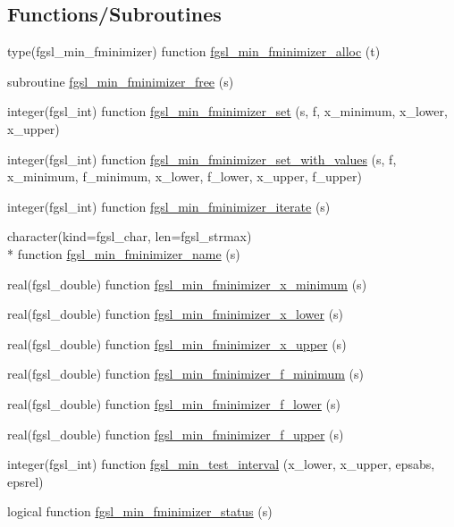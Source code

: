 \subsection*{Functions/\-Subroutines}
\begin{DoxyCompactItemize}
\item 
type(fgsl\-\_\-min\-\_\-fminimizer) function \hyperlink{min_8finc_a97de5ab1b2ebed28f37cb39e68d37f8e}{fgsl\-\_\-min\-\_\-fminimizer\-\_\-alloc} (t)
\item 
subroutine \hyperlink{min_8finc_a16f5fcf8f532d2dfd847713e2eb365fd}{fgsl\-\_\-min\-\_\-fminimizer\-\_\-free} (s)
\item 
integer(fgsl\-\_\-int) function \hyperlink{min_8finc_aebda9dded327ca8921ee1cb2e670d505}{fgsl\-\_\-min\-\_\-fminimizer\-\_\-set} (s, f, x\-\_\-minimum, x\-\_\-lower, x\-\_\-upper)
\item 
integer(fgsl\-\_\-int) function \hyperlink{min_8finc_aad6cfe468d6d91f3b2116b2a6061d2fc}{fgsl\-\_\-min\-\_\-fminimizer\-\_\-set\-\_\-with\-\_\-values} (s, f, x\-\_\-minimum, f\-\_\-minimum, x\-\_\-lower, f\-\_\-lower, x\-\_\-upper, f\-\_\-upper)
\item 
integer(fgsl\-\_\-int) function \hyperlink{min_8finc_a5160e2c8eadc15b80784a0aca5554f3c}{fgsl\-\_\-min\-\_\-fminimizer\-\_\-iterate} (s)
\item 
character(kind=fgsl\-\_\-char, len=fgsl\-\_\-strmax) \\*
function \hyperlink{min_8finc_a3396297e9c77f8b4cd38c67566eac9be}{fgsl\-\_\-min\-\_\-fminimizer\-\_\-name} (s)
\item 
real(fgsl\-\_\-double) function \hyperlink{min_8finc_aa2755b3e3fbef70186fa48681f730638}{fgsl\-\_\-min\-\_\-fminimizer\-\_\-x\-\_\-minimum} (s)
\item 
real(fgsl\-\_\-double) function \hyperlink{min_8finc_a0ee7ec3329162025dc435e578a0bb0f1}{fgsl\-\_\-min\-\_\-fminimizer\-\_\-x\-\_\-lower} (s)
\item 
real(fgsl\-\_\-double) function \hyperlink{min_8finc_a06e4f2a2956710129e0c56bb8d2d1bc9}{fgsl\-\_\-min\-\_\-fminimizer\-\_\-x\-\_\-upper} (s)
\item 
real(fgsl\-\_\-double) function \hyperlink{min_8finc_ac68af52acc51b20808a6aa71d9eccdc7}{fgsl\-\_\-min\-\_\-fminimizer\-\_\-f\-\_\-minimum} (s)
\item 
real(fgsl\-\_\-double) function \hyperlink{min_8finc_a38b3ceaf7f12a7c9406314e9e410bbb4}{fgsl\-\_\-min\-\_\-fminimizer\-\_\-f\-\_\-lower} (s)
\item 
real(fgsl\-\_\-double) function \hyperlink{min_8finc_af552d34276a2d555cf91d53aaca8bbbc}{fgsl\-\_\-min\-\_\-fminimizer\-\_\-f\-\_\-upper} (s)
\item 
integer(fgsl\-\_\-int) function \hyperlink{min_8finc_a80d14f7331cae9ab0c66397d326bc3f8}{fgsl\-\_\-min\-\_\-test\-\_\-interval} (x\-\_\-lower, x\-\_\-upper, epsabs, epsrel)
\item 
logical function \hyperlink{min_8finc_ab663e2a33741f94ed117ca1d743f2390}{fgsl\-\_\-min\-\_\-fminimizer\-\_\-status} (s)
\end{DoxyCompactItemize}


